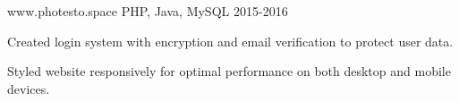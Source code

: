 \begin{cventries}
   {www.photesto.space} {PHP,
    Java, MySQL} {2015-2016} {
    \begin{cvitems}
    \item Created login system with encryption and email verification to protect
      user data.
    \item Styled website responsively for optimal performance on both desktop
      and mobile devices.
    \end{cvitems}
  }
  
\end{cventries}

